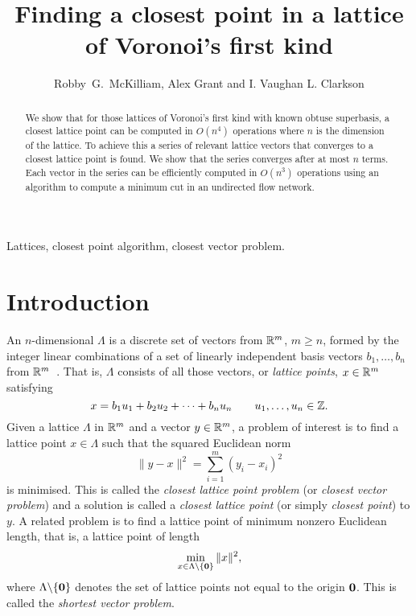 \documentclass[final,leqno]{siamltex}
\title{Finding a closest point in a lattice of Voronoi's first kind}
\author{Robby~G.~McKilliam, Alex Grant and I. Vaughan L. Clarkson}
\begin{document}
\maketitle

 \begin{abstract} 
We show that for those lattices of Voronoi's first kind with known obtuse superbasis, a closest lattice point can be computed in $O(n^4)$ operations where $n$ is the dimension of the lattice.  To achieve this a series of relevant lattice vectors that converges to a closest lattice point is found.  We show that the series converges after at most $n$ terms.  Each vector in the series can be efficiently computed in $O(n^3)$ operations using an algorithm to compute a minimum cut in an undirected flow network.  %
\end{abstract}

\begin{keywords}
Lattices, closest point algorithm, closest vector problem.
\end{keywords}

\pagestyle{myheadings}
\thispagestyle{plain} 
 

\section{Introduction}\label{sec:introduction}

An $n$-dimensional  $\Lambda$ is a discrete set of vectors from ${\mathbb R}^m$, $m \geq n$, formed by the integer linear combinations of a set of linearly independent basis vectors $b_1, \dots, b_n$ from ${\mathbb R}^m$~\cite{SPLAG}.  That is, $\Lambda$ consists of all those vectors, or \emph{lattice points}, $x \in {\mathbb R}^m$ satisfying
\[
  x = b_1 u_1 + b_2u_2 + \dots + b_n u_n \qquad u_1, \dots , u_n \in {\mathbb Z}. 
\] 
Given a lattice $\Lambda$ in ${\mathbb R}^m$ and a vector $y \in {\mathbb R}^m$, a problem of interest is to find a lattice point $x \in \Lambda$ such that the squared Euclidean norm
\[
\| y - x \|^2 = \sum_{i=1}^m (y_i - x_i)^2
\] 
is minimised.  This is called the \emph{closest lattice point problem} (or \emph{closest vector problem}) and a solution is called a \emph{closest lattice point} (or simply \emph{closest point}) to $y$. %
A related problem is to find a lattice point of minimum nonzero Euclidean length, that is, a lattice point of length
\[
\min_{x\in \Lambda \backslash \{ \boldsymbol{0} \} } \| x \|^2,
\]
where $\Lambda \backslash  \{\boldsymbol{0}\}$ denotes the set of lattice points not equal to the origin $\boldsymbol{0}$.  This is called the \emph{shortest vector problem}.
\end{document}

